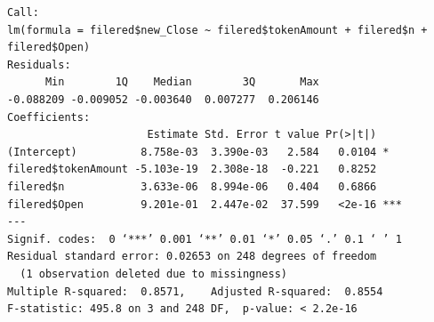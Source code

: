 \documentclass[11pt, letterpaper]{article} %
\begin{document}
\begin{lstlisting}
Call:
lm(formula = filered$new_Close ~ filered$tokenAmount + filered$n + filered$Open)
Residuals:
      Min        1Q    Median        3Q       Max
-0.088209 -0.009052 -0.003640  0.007277  0.206146
Coefficients:
                      Estimate Std. Error t value Pr(>|t|)
(Intercept)          8.758e-03  3.390e-03   2.584   0.0104 *
filered$tokenAmount -5.103e-19  2.308e-18  -0.221   0.8252
filered$n            3.633e-06  8.994e-06   0.404   0.6866
filered$Open         9.201e-01  2.447e-02  37.599   <2e-16 ***
---
Signif. codes:  0 ‘***’ 0.001 ‘**’ 0.01 ‘*’ 0.05 ‘.’ 0.1 ‘ ’ 1
Residual standard error: 0.02653 on 248 degrees of freedom
  (1 observation deleted due to missingness)
Multiple R-squared:  0.8571,	Adjusted R-squared:  0.8554
F-statistic: 495.8 on 3 and 248 DF,  p-value: < 2.2e-16
\end{lstlisting}
\end{document}
